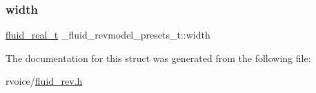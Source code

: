 \subsubsection{\texorpdfstring{width}{width}}
{\footnotesize\ttfamily \hyperlink{fluidsynth__priv_8h_a9e96f0917747b69cabb7c671bc693dbb}{fluid\+\_\+real\+\_\+t} \+\_\+fluid\+\_\+revmodel\+\_\+presets\+\_\+t\+::width}



The documentation for this struct was generated from the following file\+:\begin{DoxyCompactItemize}
\item 
rvoice/\hyperlink{fluid__rev_8h}{fluid\+\_\+rev.\+h}\end{DoxyCompactItemize}
